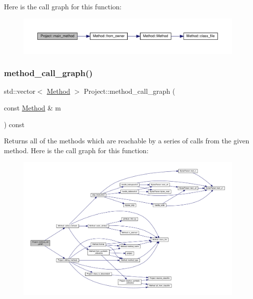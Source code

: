 Here is the call graph for this function\+:\nopagebreak
\begin{figure}[H]
\begin{center}
\leavevmode
\includegraphics[width=350pt]{classProject_a8122de9e7b4bc2a63e1391727c881474_cgraph}
\end{center}
\end{figure}
\mbox{\label{classProject_ac4d866eaedfd1083d4736530382c7b7c}} 
\subsubsection{\texorpdfstring{method\+\_\+call\+\_\+graph()}{method\_call\_graph()}}
{\footnotesize\ttfamily std\+::vector$<$ \hyperlink{classMethod}{Method} $>$ Project\+::method\+\_\+call\+\_\+graph (\begin{DoxyParamCaption}\item[{const \hyperlink{classMethod}{Method} \&}]{m }\end{DoxyParamCaption}) const}

Returns all of the methods which are reachable by a series of calls from the given method. Here is the call graph for this function\+:\nopagebreak
\begin{figure}[H]
\begin{center}
\leavevmode
\includegraphics[width=350pt]{classProject_ac4d866eaedfd1083d4736530382c7b7c_cgraph}
\end{center}
\end{figure}
\mbox{\label{classProject_af5f35c59d1175af1cfa659a597bb6353}} 
